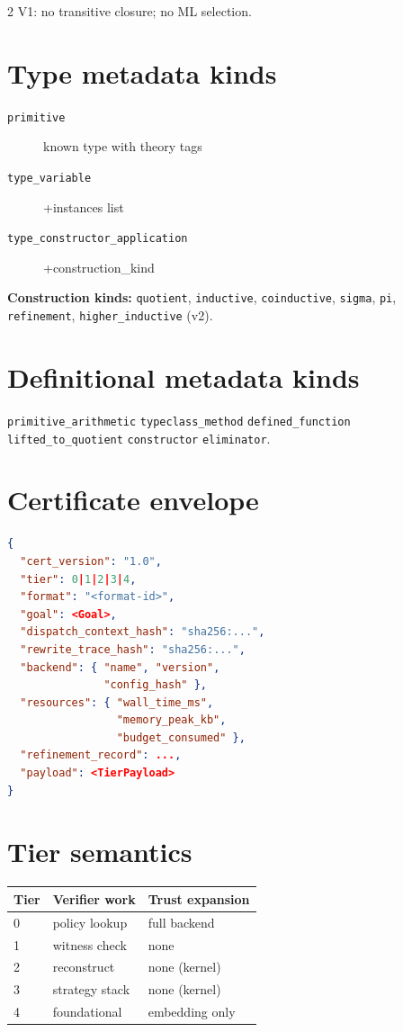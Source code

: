 \documentclass[10pt,letterpaper]{article}
\begin{document}
\begin{multicols}{2}
V1: no transitive closure; no ML selection.

\section{Type metadata kinds}

\begin{description}
  \item[\texttt{primitive}] known type with theory tags
  \item[\texttt{type\_variable}] +instances list
  \item[\texttt{type\_constructor\_application}] +construction\_kind
\end{description}

\textbf{Construction kinds:} \texttt{quotient}, \texttt{inductive},
\texttt{coinductive}, \texttt{sigma}, \texttt{pi}, \texttt{refinement},
\texttt{higher\_inductive} (v2).

\section{Definitional metadata kinds}

\texttt{primitive\_arithmetic} \textbar{}
\texttt{typeclass\_method} \textbar{}
\texttt{defined\_function} \textbar{}
\texttt{lifted\_to\_quotient} \textbar{}
\texttt{constructor} \textbar{}
\texttt{eliminator}.

\columnbreak

\section{Certificate envelope}

\begin{lstlisting}[language=json]
{
  "cert_version": "1.0",
  "tier": 0|1|2|3|4,
  "format": "<format-id>",
  "goal": <Goal>,
  "dispatch_context_hash": "sha256:...",
  "rewrite_trace_hash": "sha256:...",
  "backend": { "name", "version",
               "config_hash" },
  "resources": { "wall_time_ms",
                 "memory_peak_kb",
                 "budget_consumed" },
  "refinement_record": ...,
  "payload": <TierPayload>
}
\end{lstlisting}

\section{Tier semantics}

\small
\begin{tabular}{@{}lll@{}}
\toprule
Tier & Verifier work & Trust expansion \\
\midrule
0 & policy lookup & full backend \\
1 & witness check & none \\
2 & reconstruct & none (kernel) \\
3 & strategy stack & none (kernel) \\
4 & foundational & embedding only \\
\bottomrule
\end{tabular}


\end{multicols}
\end{document}

